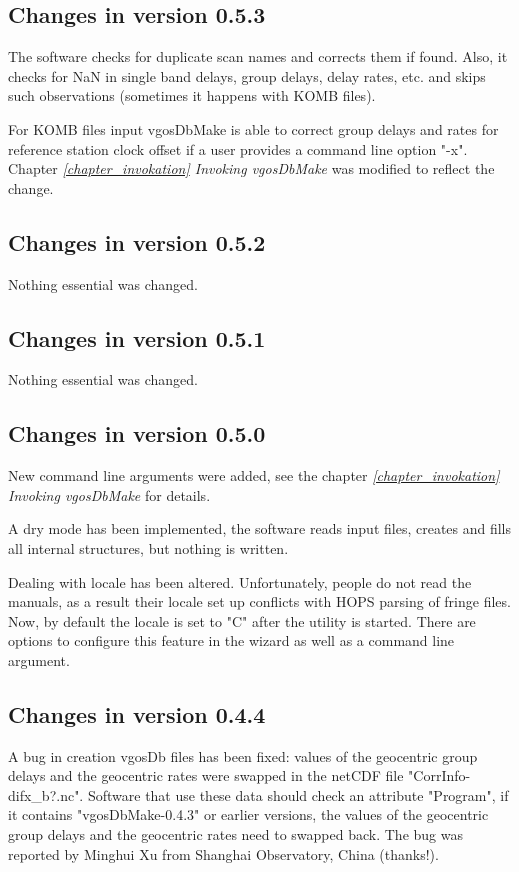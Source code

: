 \documentclass [10pt,letterpaper]{report}
\begin{document}
\subsection{Changes in version 0.5.3}
The software checks for duplicate scan names and corrects them if found. Also, it
checks for NaN in single band delays, group delays, delay rates, etc. and skips such
observations (sometimes it happens with KOMB files).

For KOMB files input vgosDbMake is able to correct group delays and rates for
reference station clock offset if a user provides a command line option "-x".
Chapter \emph{\ref{chapter_invokation} Invoking vgosDbMake} was modified to reflect
the change.


\subsection{Changes in version 0.5.2}
Nothing essential was changed.


\subsection{Changes in version 0.5.1}
Nothing essential was changed.



\subsection{Changes in version 0.5.0}
New command line arguments were added, see the chapter
\emph{\ref{chapter_invokation} Invoking vgosDbMake} for details.

A dry mode has been implemented, the software reads input files, creates and fills
all internal structures, but nothing is written.

Dealing with locale has been altered. Unfortunately, people do not read the manuals,
as a result their locale set up conflicts with HOPS parsing of fringe files. Now,
by default the locale is set to "C" after the utility is started. There are options
to configure this feature in the wizard as well as a command line argument.


\subsection{Changes in version 0.4.4}
A bug in creation vgosDb files has been fixed: values of the geocentric group delays and
the geocentric rates were swapped in the netCDF file "CorrInfo-difx\_b?.nc". Software
that use these data should check an attribute "Program", if it contains "vgosDbMake-0.4.3"
or earlier versions, the values of the geocentric group delays and the geocentric rates
need to swapped back. The bug was reported by Minghui Xu from Shanghai Observatory, China
(thanks!).
\end{document}
